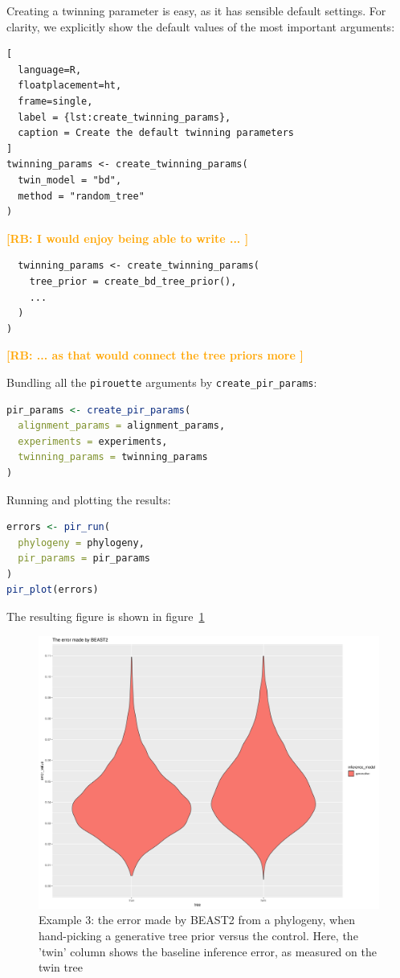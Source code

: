 \documentclass{article}
\newcommand{\richel}[1]{\textcolor{orange}{\textbf{[RB: #1]}}}
\begin{document}
Creating a twinning parameter is easy, as it has sensible default settings.
For clarity, we explicitly show the default values of the most
important arguments:

\begin{lstlisting}[
  language=R, 
  floatplacement=ht, 
  frame=single,
  label = {lst:create_twinning_params},
  caption = Create the default twinning parameters
]
twinning_params <- create_twinning_params(
  twin_model = "bd", 
  method = "random_tree"
)
\end{lstlisting}

\richel{
  I would enjoy being able to write ...
}
\begin{lstlisting}
  twinning_params <- create_twinning_params(
    tree_prior = create_bd_tree_prior(),
    ...
  )
)
\end{lstlisting}
\richel{
  ... as that would connect the tree priors more
}

Bundling all the \verb;pirouette; arguments by \verb;create_pir_params;:

\begin{lstlisting}[language=R, floatplacement=ht, frame=single]
pir_params <- create_pir_params(
  alignment_params = alignment_params,
  experiments = experiments,
  twinning_params = twinning_params
)
\end{lstlisting}

Running and plotting the results:

\begin{lstlisting}[language=R, floatplacement=ht, frame=single]
errors <- pir_run(
  phylogeny = phylogeny,
  pir_params = pir_params
)
pir_plot(errors)
\end{lstlisting}

The resulting figure is shown in figure~\ref{fig:example_3}

\begin{figure}[ht]
  \includegraphics[width=\textwidth]{example_3_errors.png}
  \caption{
    Example 3: the error made by BEAST2 from a phylogeny, 
    when hand-picking a generative tree prior versus the control.
    Here, the 'twin' column shows the baseline inference error,
    as measured on the twin tree
  }
  \label{fig:example_3}
\end{figure}
\end{document}
